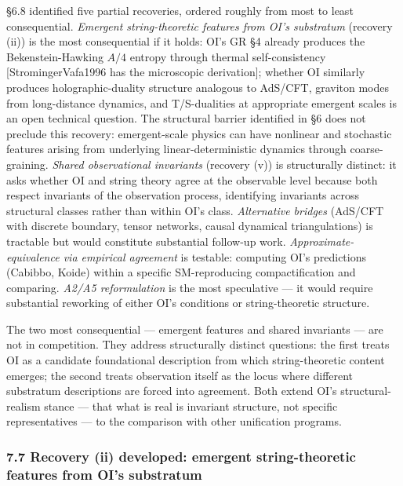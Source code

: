 \documentclass[
]{article}
\begin{document}
§6.8 identified five partial recoveries, ordered roughly from most to
least consequential. \emph{Emergent string-theoretic features from OI's
substratum} (recovery (ii)) is the most consequential if it holds: OI's
GR §4 already produces the Bekenstein-Hawking \(A/4\) entropy through
thermal self-consistency {[}StromingerVafa1996 has the microscopic
derivation{]}; whether OI similarly produces holographic-duality
structure analogous to AdS/CFT, graviton modes from long-distance
dynamics, and T/S-dualities at appropriate emergent scales is an open
technical question. The structural barrier identified in §6 does not
preclude this recovery: emergent-scale physics can have nonlinear and
stochastic features arising from underlying linear-deterministic
dynamics through coarse-graining. \emph{Shared observational invariants}
(recovery (v)) is structurally distinct: it asks whether OI and string
theory agree at the observable level because both respect invariants of
the observation process, identifying invariants across structural
classes rather than within OI's class. \emph{Alternative bridges}
(AdS/CFT with discrete boundary, tensor networks, causal dynamical
triangulations) is tractable but would constitute substantial follow-up
work. \emph{Approximate-equivalence via empirical agreement} is
testable: computing OI's predictions (Cabibbo, Koide) within a specific
SM-reproducing compactification and comparing. \emph{A2/A5
reformulation} is the most speculative --- it would require substantial
reworking of either OI's conditions or string-theoretic structure.

The two most consequential --- emergent features and shared invariants
--- are not in competition. They address structurally distinct
questions: the first treats OI as a candidate foundational description
from which string-theoretic content emerges; the second treats
observation itself as the locus where different substratum descriptions
are forced into agreement. Both extend OI's structural-realism stance
--- that what is real is invariant structure, not specific
representatives --- to the comparison with other unification programs.

\hypertarget{recovery-ii-developed-emergent-string-theoretic-features-from-ois-substratum}{%
\subsubsection{7.7 Recovery (ii) developed: emergent string-theoretic
features from OI's
substratum}\label{recovery-ii-developed-emergent-string-theoretic-features-from-ois-substratum}}
\end{document}
